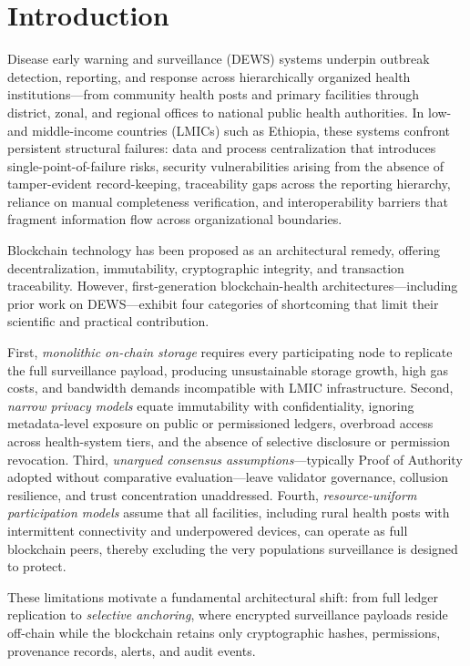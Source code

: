\section{Introduction}\label{sec:introduction}

Disease early warning and surveillance (DEWS) systems underpin outbreak detection, reporting, and response across hierarchically organized health institutions---from community health posts and primary facilities through district, zonal, and regional offices to national public health authorities. In low- and middle-income countries (LMICs) such as Ethiopia, these systems confront persistent structural failures: data and process centralization that introduces single-point-of-failure risks, security vulnerabilities arising from the absence of tamper-evident record-keeping, traceability gaps across the reporting hierarchy, reliance on manual completeness verification, and interoperability barriers that fragment information flow across organizational boundaries.

Blockchain technology has been proposed as an architectural remedy, offering decentralization, immutability, cryptographic integrity, and transaction traceability.\cite{yaga2018blockchain} However, first-generation blockchain-health architectures---including prior work on DEWS---exhibit four categories of shortcoming that limit their scientific and practical contribution.

First, \emph{monolithic on-chain storage} requires every participating node to replicate the full surveillance payload, producing unsustainable storage growth, high gas costs, and bandwidth demands incompatible with LMIC infrastructure.\cite{kelly2019key} Second, \emph{narrow privacy models} equate immutability with confidentiality, ignoring metadata-level exposure on public or permissioned ledgers, overbroad access across health-system tiers, and the absence of selective disclosure or permission revocation.\cite{finlayson2019adversarial} Third, \emph{unargued consensus assumptions}---typically Proof of Authority adopted without comparative evaluation---leave validator governance, collusion resilience, and trust concentration unaddressed.\cite{core2012building} Fourth, \emph{resource-uniform participation models} assume that all facilities, including rural health posts with intermittent connectivity and underpowered devices, can operate as full blockchain peers, thereby excluding the very populations surveillance is designed to protect.

These limitations motivate a fundamental architectural shift: from full ledger replication to \emph{selective anchoring}, where encrypted surveillance payloads reside off-chain while the blockchain retains only cryptographic hashes, permissions, provenance records, alerts, and audit events.

